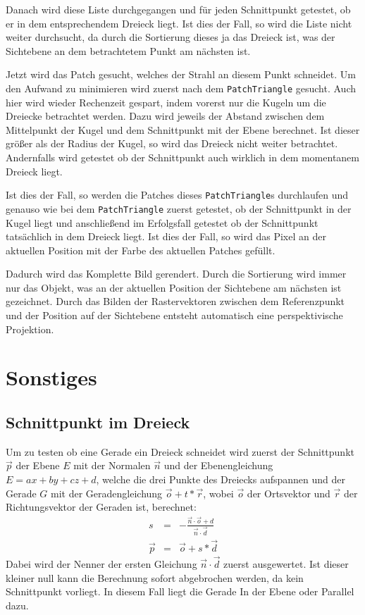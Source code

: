 \documentclass[final,a4paper,11pt,notitlepage,halfparskip]{scrreprt}
\begin{document}
Danach wird diese Liste durchgegangen und für jeden Schnittpunkt getestet, ob
er in dem entsprechendem Dreieck liegt. Ist dies der Fall, so wird die Liste
nicht weiter durchsucht, da durch die Sortierung dieses ja das Dreieck ist, was
der Sichtebene an dem betrachtetem Punkt am nächsten ist.

Jetzt wird das Patch gesucht, welches der Strahl an diesem Punkt schneidet. Um
den Aufwand zu minimieren wird zuerst nach dem \texttt{PatchTriangle}
gesucht. Auch hier wird wieder Rechenzeit gespart, indem vorerst nur die Kugeln
um die Dreiecke betrachtet werden. Dazu wird jeweils der Abstand zwischen dem
Mittelpunkt der Kugel und dem Schnittpunkt mit der Ebene berechnet. Ist dieser
größer als der Radius der Kugel, so wird das Dreieck nicht weiter betrachtet. 
Andernfalls wird getestet ob der Schnittpunkt auch wirklich in dem momentanem
Dreieck liegt.

Ist dies der Fall, so werden die Patches dieses \texttt{PatchTriangle}s
durchlaufen und genauso wie bei dem \texttt{PatchTriangle} zuerst getestet, ob
der Schnittpunkt in der Kugel liegt und anschließend im Erfolgsfall getestet
ob der Schnittpunkt tatsächlich in dem Dreieck liegt. Ist dies der Fall, so wird
das Pixel an der aktuellen Position mit der Farbe des aktuellen Patches gefüllt.

Dadurch wird das Komplette Bild gerendert. Durch die Sortierung wird immer nur
das Objekt, was an der aktuellen Position der Sichtebene am nächsten ist
gezeichnet. Durch das Bilden der Rastervektoren zwischen dem Referenzpunkt und
der Position auf der Sichtebene entsteht automatisch eine perspektivische
Projektion.

\section{Sonstiges}
\subsection{Schnittpunkt im Dreieck}
Um zu testen ob eine Gerade ein Dreieck schneidet wird zuerst der Schnittpunkt
$\vec{p}$ der Ebene $E$ mit der Normalen $\vec{n}$ und der Ebenengleichung $E =
ax + by + cz + d$, welche die drei Punkte des Dreiecks aufspannen und der Gerade 
$G$ mit der Geradengleichung $\vec{o} + t*\vec{r}$, wobei $\vec{o}$ der 
Ortsvektor und $\vec{r}$ der Richtungsvektor der Geraden ist, berechnet:
\begin{eqnarray*}
    s       &=& -\frac{\vec{n} \cdot \vec{o} + d}{\vec{n} \cdot \vec{d}}\\
    \vec{p} &=& \vec{o} + s * \vec{d}
\end{eqnarray*}
Dabei wird der Nenner der ersten Gleichung $\vec{n} \cdot \vec{d}$ zuerst
ausgewertet. Ist dieser kleiner null kann die Berechnung sofort abgebrochen
werden, da kein Schnittpunkt vorliegt. In diesem Fall liegt die Gerade In der
Ebene oder Parallel dazu.
\end{document}
